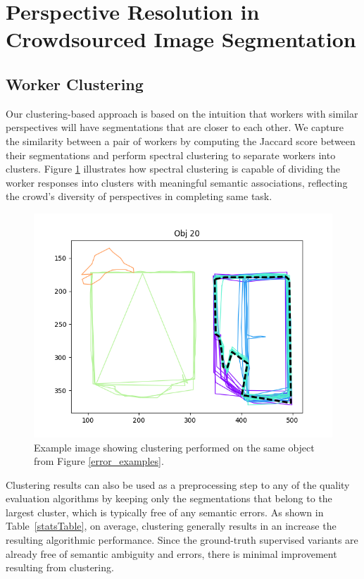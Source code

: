 \section{Perspective Resolution in Crowdsourced Image Segmentation}
\subsection{Worker Clustering}
Our clustering-based approach is based on the intuition that workers with similar perspectives  will have segmentations that are closer to each other. We capture the similarity between a pair of workers by computing the Jaccard score between their segmentations and perform spectral clustering to separate workers into clusters. Figure \ref{cluster_example} illustrates how spectral clustering is capable of dividing the worker responses into clusters with meaningful semantic associations, reflecting the crowd's diversity of perspectives in completing same task.
    \begin{figure}[h!]
      \centering
      \includegraphics[width=\textwidth]{plots/20.png}
      \caption{Example image showing clustering performed on the same object from Figure \ref{error_examples}.}
      \label{cluster_example}
    \end{figure}
\par Clustering results can also be used as a preprocessing step to any of the quality evaluation algorithms by keeping only the segmentations that belong to the largest cluster, which is typically free of any semantic errors. As shown in Table~\ref{statsTable}, on average, clustering generally results in an increase the resulting algorithmic performance. Since the ground-truth supervised variants are already free of semantic ambiguity and errors, there is minimal improvement resulting from clustering. %

